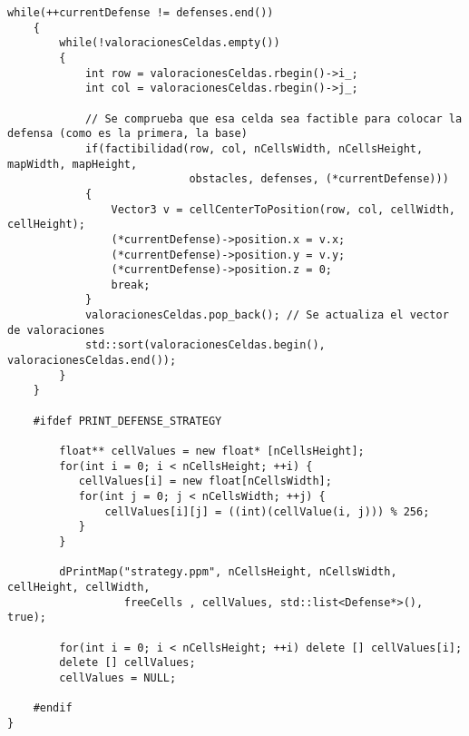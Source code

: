 \begin{lstlisting}[frame=single]
    while(++currentDefense != defenses.end())
    {
        while(!valoracionesCeldas.empty())
        {
            int row = valoracionesCeldas.rbegin()->i_;
            int col = valoracionesCeldas.rbegin()->j_;

            // Se comprueba que esa celda sea factible para colocar la defensa (como es la primera, la base)
            if(factibilidad(row, col, nCellsWidth, nCellsHeight, mapWidth, mapHeight,
                            obstacles, defenses, (*currentDefense)))
            {
                Vector3 v = cellCenterToPosition(row, col, cellWidth, cellHeight);
                (*currentDefense)->position.x = v.x;
                (*currentDefense)->position.y = v.y;
                (*currentDefense)->position.z = 0;
                break;
            }
            valoracionesCeldas.pop_back(); // Se actualiza el vector de valoraciones
            std::sort(valoracionesCeldas.begin(), valoracionesCeldas.end());
        }
    }

    #ifdef PRINT_DEFENSE_STRATEGY

        float** cellValues = new float* [nCellsHeight];
        for(int i = 0; i < nCellsHeight; ++i) {
           cellValues[i] = new float[nCellsWidth];
           for(int j = 0; j < nCellsWidth; ++j) {
               cellValues[i][j] = ((int)(cellValue(i, j))) % 256;
           }
        }

        dPrintMap("strategy.ppm", nCellsHeight, nCellsWidth, cellHeight, cellWidth,
                  freeCells , cellValues, std::list<Defense*>(), true);

        for(int i = 0; i < nCellsHeight; ++i) delete [] cellValues[i];
        delete [] cellValues;
        cellValues = NULL;

    #endif
}
\end{lstlisting}
